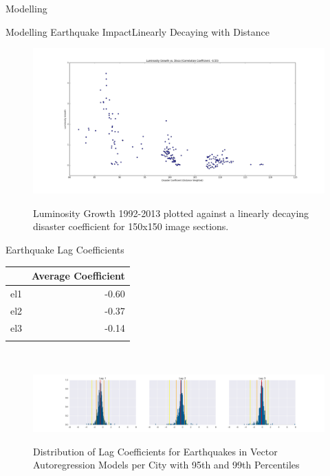 \documentclass{beamer}
\begin{document}
\begin{section}{Modelling}
  \begin{frame}{Modelling Earthquake Impact}{Linearly Decaying with Distance}
    \begin{figure}
      \centering
      \includegraphics[width=1\linewidth]{linear-lum-vs-disco}\label{fig:linear-model-disco-vs-lum-growth} %
      \caption{Luminosity Growth 1992-2013 plotted against a linearly decaying disaster coefficient for 150x150 image sections.}
    \end{figure}
  \end{frame}

  \begin{frame}{Earthquake Lag Coefficients}
    \begin{center}
      \begin{tabular}{lr}\\
        \toprule
        {} & Average Coefficient \\
        \midrule
        el1 & -0.60 \\
        el2 & -0.37 \\
        el3 & -0.14 \\
        \bottomrule\\
      \end{tabular}\\
    \end{center}
    \begin{figure}
      \centering
      \includegraphics[width=\linewidth]{non_balanced_earthquake_coefficients_distribution}\label{fig:non_balanced_earthquake_coefficients_distribution}
      \caption{Distribution of Lag Coefficients for Earthquakes in Vector Autoregression Models per City with 95th and 99th Percentiles}
    \end{figure}
  \end{frame}


\end{section}
\end{document}
